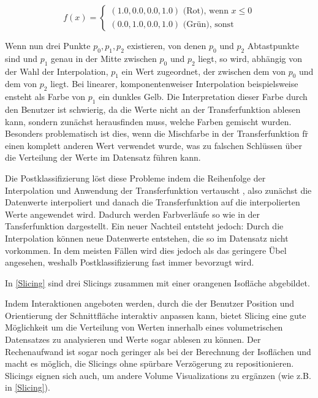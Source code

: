 \documentclass[a4paper,fontsize=12pt,toc=bib,halfparskip,ngerman]{scrartcl}
\begin{document}
\begin{equation}
	f(x)= 
	\begin{cases}
		(1.0, 0.0, 0.0, 1.0)\text{ (Rot), wenn } x\leq 0\\
		(0.0, 1.0, 0.0, 1.0)\text{ (Gr\"un), sonst}
	\end{cases}
\end{equation}

Wenn nun drei Punkte $p_0, p_1, p_2$ existieren, von denen $p_0$ und $p_2$ Abtastpunkte sind und $p_1$ genau in der Mitte zwischen $p_0$ und $p_2$ liegt, so wird, abh\"angig von der Wahl der Interpolation, $p_1$ ein Wert zugeordnet, der zwischen dem von $p_0$ und dem von $p_2$ liegt. Bei linearer, komponentenweiser Interpolation beispielsweise ensteht als Farbe von $p_1$ ein dunkles Gelb. Die Interpretation dieser Farbe durch den Benutzer ist schwierig, da die Werte nicht an der Transferfunktion ablesen kann, sondern zun\"achst herausfinden muss, welche Farben gemischt wurden. Besonders problematisch ist dies, wenn die Mischfarbe in der Transferfunktion f\"r einen komplett anderen Wert verwendet wurde, was zu falschen Schl\"ussen \"uber die Verteilung der Werte im Datensatz f\"uhren kann.

Die Postklassifizierung l\"ost diese Probleme indem die Reihenfolge der Interpolation und Anwendung der Transferfunktion vertauscht , also zun\"achst die Datenwerte interpoliert und danach die Transferfunktion auf die interpolierten Werte angewendet wird. Dadurch werden Farbverl\"aufe so wie in der Tansferfunktion dargestellt. Ein neuer Nachteil entsteht jedoch: Durch die Interpolation k\"onnen neue Datenwerte entstehen, die so im Datensatz nicht vorkommen. In dem meisten F\"allen wird dies jedoch als das geringere \"Ubel angesehen, weshalb Postklassifizierung fast immer bevorzugt wird.

In \cref{Slicing} sind drei Slicings zusammen mit einer orangenen Isofl\"ache abgebildet.

Indem Interaktionen angeboten werden, durch die der Benutzer Position und Orientierung der Schnittfl\"ache interaktiv anpassen kann, bietet Slicing eine gute M\"oglichkeit um die Verteilung von Werten innerhalb eines volumetrischen Datensatzes zu analysieren und Werte sogar ablesen zu k\"onnen. Der Rechenaufwand ist sogar noch geringer als bei der Berechnung der Isofl\"achen und macht es m\"oglich, die Slicings ohne sp\"urbare Verz\"ogerung zu repositionieren. Slicings eignen sich auch, um andere Volume Visualizations zu erg\"anzen (wie z.B. in \cref{Slicing}).
\end{document}
